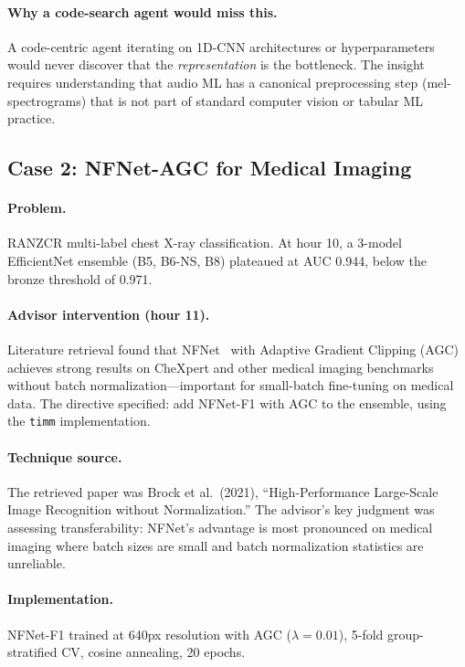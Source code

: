 \documentclass{article}
\begin{document}
\paragraph{Why a code-search agent would miss this.} A code-centric agent iterating on 1D-CNN architectures or hyperparameters would never discover that the \emph{representation} is the bottleneck. The insight requires understanding that audio ML has a canonical preprocessing step (mel-spectrograms) that is not part of standard computer vision or tabular ML practice.

\subsection{Case 2: NFNet-AGC for Medical Imaging}
\label{sec:case_nfnet}

\paragraph{Problem.} RANZCR multi-label chest X-ray classification. At hour 10, a 3-model EfficientNet ensemble (B5, B6-NS, B8) plateaued at AUC 0.944, below the bronze threshold of 0.971.

\paragraph{Advisor intervention (hour 11).} Literature retrieval found that NFNet~\citep{brock2021nfnet} with Adaptive Gradient Clipping (AGC) achieves strong results on CheXpert and other medical imaging benchmarks without batch normalization---important for small-batch fine-tuning on medical data. The directive specified: add NFNet-F1 with AGC to the ensemble, using the \texttt{timm} implementation.

\paragraph{Technique source.} The retrieved paper was Brock et al.\ (2021), ``High-Performance Large-Scale Image Recognition without Normalization.'' The advisor's key judgment was assessing transferability: NFNet's advantage is most pronounced on medical imaging where batch sizes are small and batch normalization statistics are unreliable.

\paragraph{Implementation.} NFNet-F1 trained at 640px resolution with AGC ($\lambda = 0.01$), 5-fold group-stratified CV, cosine annealing, 20 epochs.
\end{document}
